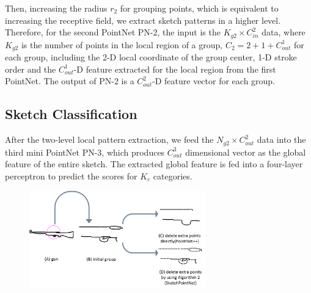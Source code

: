Then, increasing the radius $r_2$ for grouping points, which is equivalent to increasing the receptive field, we extract sketch patterns in a higher level.
%
Therefore, for the second PointNet PN-2, the input is the $K_{g2} \times C^2_{in}$ data, where $K_{g2}$ is the number of points in the local region of a group, $C_2=2+1+C^1_{out}$ for each group, including the 2-D local coordinate of the group center, 1-D stroke order and the $C^1_{out}$-D feature extracted for the local region from the first PointNet. 
%
The output of PN-2 is a $C^2_{out}$-D feature vector for each group.

\subsection{Sketch Classification}
\label{ssec:classification}

After the two-level local pattern extraction, we feed the $N_{g2} \times C^2_{out}$ data into the third mini PointNet PN-3, which produces $C^{3}_{out}$ dimensional vector as the global feature of the entire sketch. 
%
The extracted global feature is fed into a four-layer perceptron to predict the scores for $K_c$ categories. 







\begin{figure}
    \center
    \includegraphics[width=3in]{images/group.png}
    \label{fig:group}
\end{figure}



